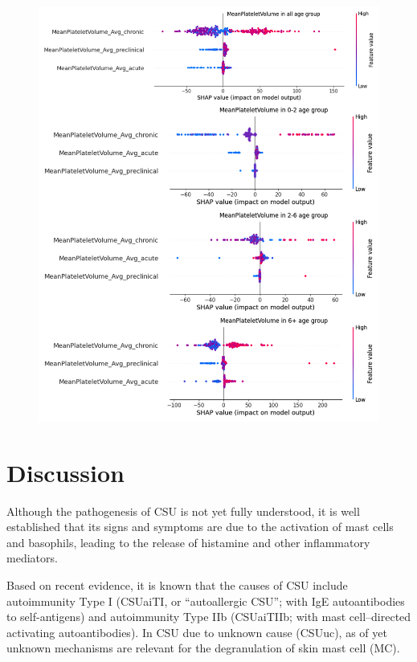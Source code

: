 \documentclass[final,1p,times,authoryear]{elsarticle}
\begin{document}
\begin{figure}[t]  
    \centering 
    \includegraphics[width=\textwidth]{figures/modelexplanation_age2.png}
    \caption{}\label{modelexplanation_age2}

\end{figure}

\section{Discussion}\label{Discussion}



Although the pathogenesis of CSU is not yet fully understood, it is well established that its signs and symptoms are due to the activation of mast cells and basophils, leading to the release of histamine and other inflammatory mediators\citep{Zuberbier2021The}. 

Based on recent evidence, it is known that the causes of CSU include autoimmunity Type I (CSUaiTI, or “autoallergic CSU”; with IgE autoantibodies to self-antigens) and autoimmunity Type IIb (CSUaiTIIb; with mast cell–directed activating autoantibodies). In CSU due to unknown cause (CSUuc), as of yet unknown mechanisms are relevant for the degranulation of skin mast cell (MC)\citep{sella2023type, Maronese2023IgG}.
\end{document}
